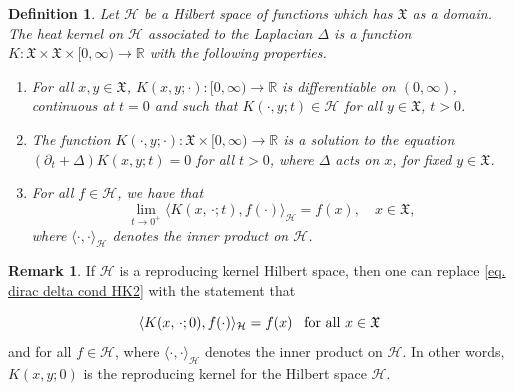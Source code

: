 \documentclass[11pt,reqno]{amsart}
\newtheorem{definition}[theorem]{Definition}
\theoremstyle{remark}
\theoremstyle{definition}
\newtheorem{remark}{Remark}
\numberwithin{theorem}{section} \numberwithin{equation}{section}
\newcommand{\Hil}{\mathcal{H}}
\newcommand{\X}{\mathfrak{X}}
\begin{document}
\medskip
\begin{definition}\label{def: HK Hilb space}
  Let $\mathcal{H}$ be a Hilbert space of functions which has $\X$ as a domain. The heat kernel on $\mathcal{H}$ associated to the Laplacian $\Delta$ is a function $K:\X\times\X\times[0,\infty)\to\mathbb{R}$ with the following properties.
  \begin{enumerate}
    \item For all $x,y\in\X$, $K(x,y;\cdot):[0,\infty)\to\mathbb{R}$ is differentiable on $(0,\infty)$, continuous at $t=0$ and such that $K(\cdot, y;t)\in \mathcal{H}$ for all $y\in\X$, $t>0$.
    \item The function $K(\cdot,y;\cdot):\X\times[0,\infty)\to\mathbb{R}$ is a solution to the equation
$(\partial_t+\Delta)K(x,y;t)=0$ for all $t>0$, where $\Delta$ acts on $x$, for fixed $y\in\X$.
    \item For all $f\in \mathcal{H}$, we have that
    \begin{equation}\label{eq. dirac delta cond HK2}
\lim\limits_{t\rightarrow 0^+} \langle K(x,\,\cdot;t), f(\cdot)\rangle_{\mathcal{H}}=f(x), \quad x\in\X,
\end{equation}
where $\langle \cdot, \cdot \rangle_{\mathcal{H}}$ denotes the inner product on $\mathcal{H}$.
  \end{enumerate}
\end{definition}

\medskip
\begin{remark} If $\Hil$ is a reproducing kernel Hilbert space, then one can replace \eqref{eq. dirac delta cond HK2}
with the statement that
\item \begin{equation}\label{eq. dirac delta cond HK3}
\langle K(x,\,\cdot;0), f(\cdot)\rangle_{\mathcal{H}}=f(x)
\,\,\,\,\,\text{\rm for all $x\in\X$}
\end{equation}
and for all $f\in \mathcal{H}$, where $\langle \cdot, \cdot \rangle_{\mathcal{H}}$ denotes the inner product on $\mathcal{H}$.
In other words, $K(x,y;0)$ is the reproducing kernel for the Hilbert space $\mathcal{H}$.
\end{remark}

\end{document}
